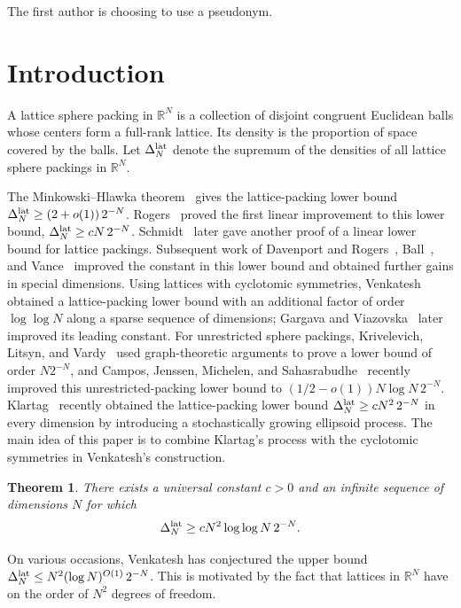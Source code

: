 \documentclass[11pt]{article}
\newtheorem{theorem}{Theorem}[section]
\theoremstyle{remark}
\begin{document}
The first author is choosing to use a pseudonym.

\section{Introduction}

A lattice sphere packing in $\mathbb R^N$ is a collection of disjoint
congruent Euclidean balls whose centers form a full-rank lattice.  Its density
is the proportion of space covered by the balls.  Let $\Delta_N^{\rm lat}$
denote the supremum of the densities of all lattice sphere packings in
$\mathbb R^N$.

The Minkowski--Hlawka theorem~\cite{Hlawka} gives the lattice-packing lower
bound $\Delta_N^{\rm lat}\ge (2+o(1))\,2^{-N}$.
Rogers~\cite{Rogers} proved the first linear improvement to this lower bound,
$\Delta_N^{\rm lat}\ge cN\,2^{-N}$.  Schmidt~\cite{Schmidt} later gave another
proof of a linear lower bound for lattice packings.  Subsequent work of
Davenport and Rogers~\cite{DavenportRogers}, Ball~\cite{Ball}, and
Vance~\cite{Vance} improved the constant in this lower bound and obtained
further gains in special dimensions.  Using lattices with
cyclotomic symmetries, Venkatesh~\cite{Venkatesh} obtained a
lattice-packing lower bound with an
additional factor of order $\log\log N$ along a sparse sequence of
dimensions; Gargava and Viazovska~\cite{GargavaViazovska} later improved its
leading constant.  For unrestricted sphere packings,
Krivelevich, Litsyn, and Vardy~\cite{KLV} used
graph-theoretic arguments to prove a lower bound of order $N2^{-N}$, and
Campos, Jenssen,
Michelen, and Sahasrabudhe~\cite{CJMS} recently improved this
unrestricted-packing lower
bound to
$(1/2-o(1))N\log N\,2^{-N}$.
Klartag~\cite{Klartag} recently obtained the lattice-packing lower bound
$\Delta_N^{\rm lat}\ge cN^2\,2^{-N}$ in every dimension by introducing a
stochastically growing ellipsoid process.  The main
idea of this paper is to combine Klartag's process with the cyclotomic
symmetries in Venkatesh's construction.

\begin{theorem}\label{thm:main}
There exists a universal constant $c>0$ and an infinite
sequence of dimensions $N$ for which
\[
        \Delta_N^{\rm lat}\ge cN^2\log\log N\,2^{-N}.
\]
\end{theorem}

On various occasions, Venkatesh has conjectured the upper bound
$\Delta_N^{\rm lat}\le N^2(\log N)^{O(1)}\,2^{-N}$.  This is motivated by the
fact that lattices in $\mathbb R^N$ have on the order of $N^2$ degrees of
freedom.
\end{document}
